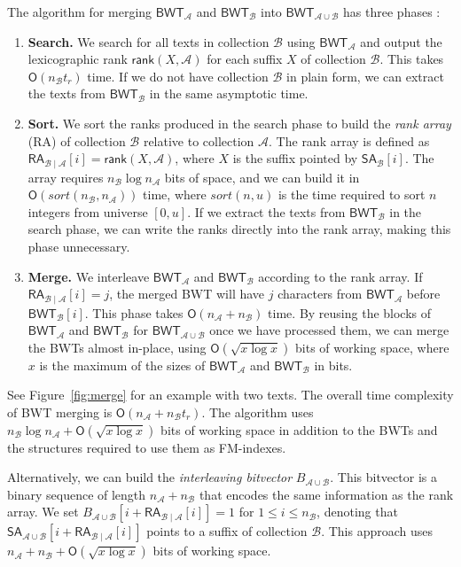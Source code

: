 \documentclass[smallabstract,smallcaptions]{dccpaper}
\newcommand{\Oh}{\ensuremath{\mathsf{O}}}
\newcommand{\BWT}{\textsf{BWT}}
\newcommand{\RA}{\textsf{RA}}
\newcommand{\mSA}{\ensuremath{\mathsf{SA}}}
\newcommand{\mBWT}{\ensuremath{\mathsf{BWT}}}
\newcommand{\mRA}{\ensuremath{\mathsf{RA}}}
\newcommand{\mrank}{\ensuremath{\mathsf{rank}}}
\newcommand{\Acoll}{\ensuremath{\mathcal{A}}}
\newcommand{\Bcoll}{\ensuremath{\mathcal{B}}}
\begin{document}
The algorithm for merging $\mBWT_{\Acoll}$ and $\mBWT_{\Bcoll}$ into $\mBWT_{\Acoll \cup \Bcoll}$ has three phases \cite{Siren2009}:
\begin{enumerate}

\item \textbf{Search.} We search for all texts in collection $\Bcoll$ using $\mBWT_{\Acoll}$ and output the lexicographic rank $\mrank(X, \Acoll)$ for each suffix $X$ of collection $\Bcoll$. This takes $\Oh(n_{\Bcoll} t_{r})$ time. If we do not have collection $\Bcoll$ in plain form, we can extract the texts from $\mBWT_{\Bcoll}$ in the same asymptotic time.

\item \textbf{Sort.} We sort the ranks produced in the search phase to build the \emph{rank array} (\RA) of collection $\Bcoll$ relative to collection $\Acoll$. The rank array is defined as $\mRA_{\Bcoll \mid \Acoll}[i] = \mrank(X, \Acoll)$, where $X$ is the suffix pointed by $\mSA_{\Bcoll}[i]$. The array requires $n_{\Bcoll} \log n_{\Acoll}$ bits of space, and we can build it in $\Oh(sort(n_{\Bcoll}, n_{\Acoll}))$ time, where $sort(n, u)$ is the time required to sort $n$ integers from universe $[0,u]$. If we extract the texts from $\mBWT_{\Bcoll}$ in the search phase, we can write the ranks directly into the rank array, making this phase unnecessary.

\item \textbf{Merge.} We interleave $\mBWT_{\Acoll}$ and $\mBWT_{\Bcoll}$ according to the rank array. If $\mRA_{\Bcoll \mid \Acoll}[i] = j$, the merged \BWT{} will have $j$ characters from $\mBWT_{\Acoll}$ before $\mBWT_{\Bcoll}[i]$. This phase takes $\Oh(n_{\Acoll} + n_{\Bcoll})$ time. By reusing the blocks of $\mBWT_{\Acoll}$ and $\mBWT_{\Bcoll}$ for $\mBWT_{\Acoll \cup \Bcoll}$ once we have processed them, we can merge the \BWT{}s almost in-place, using $\Oh(\sqrt{x \log x})$ bits of working space, where $x$ is the maximum of the sizes of $\mBWT_{\Acoll}$ and $\mBWT_{\Bcoll}$ in bits.

\end{enumerate}
See Figure~\ref{fig:merge} for an example with two texts. The overall time complexity of \BWT{} merging is $\Oh(n_{\Acoll} + n_{\Bcoll} t_{r})$. The algorithm uses $n_{\Bcoll} \log n_{\Acoll} + \Oh(\sqrt{x \log x})$ bits of working space in addition to the \BWT{}s and the structures required to use them as FM-indexes.

Alternatively, we can build the \emph{interleaving bitvector} $B_{\Acoll \cup \Bcoll}$. This bitvector is a binary sequence of length $n_{\Acoll} + n_{\Bcoll}$ that encodes the same information as the rank array. We set $B_{\Acoll \cup \Bcoll}[i + \mRA_{\Bcoll \mid \Acoll}[i]] = 1$ for $1 \le i \le n_{\Bcoll}$, denoting that $\mSA_{\Acoll \cup \Bcoll}[i + \mRA_{\Bcoll \mid \Acoll}[i]]$ points to a suffix of collection $\Bcoll$. This approach uses $n_{\Acoll} + n_{\Bcoll} + \Oh(\sqrt{x \log x})$ bits of working space.
\end{document}
